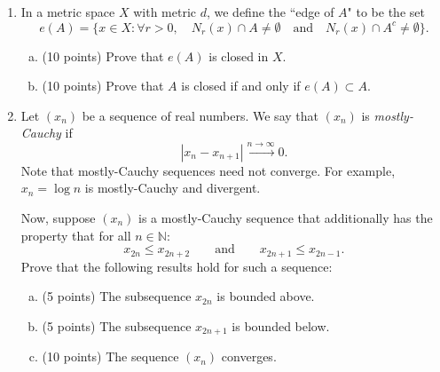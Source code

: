 \documentclass{amsart}
\newtheorem{theorem}{Theorem}
\begin{document}
\begin{enumerate}[1.]
\begin{theorem}
\begin{proof}
		Assume that $A$ is countable. 
		Consider any $b \in B$. Then $f^{-1}(b) \subseteq A$ is at most countable and non-empty. Therefore, we can enumerate $f^{-1}(b)$
		as follows:
		\[
			f^{-1}(b) = \{a_{1,b}, a_{2,b}, a_{3,b}, ... \}	
		\]
		Let us construct a function $g: B \to A$ defined as follows:
		\[
			g(b) = a_{1,b}	
		\]
		We must first show that $g$ is injective.
		Consider the case where $g(b_1) = g(b_2)$ for some $b_1, b_2 \in B$. Then we know that 
		\[
			a_{1,b_1} = a_{1,b_2}
		\]
		Since $f$ is a function, $f^{-1}(b_1) \cap f^{-1}(b_2) = \phi$ (one element of the domain cannot be sent to multiple values in the range).
		Thus, the only way for $a_{1,b_1} = a_{1,b_2}$ is if $b_1 = b_2$. Thus, $g$ is injective.
		Finally, we see from Lemma 19 that, since $g: B \to A$ is injective and $A$ is countable,
		then $B$ is countable.
	\end{proof}
\end{theorem}
\newpage
\item In a metric space $X$ with metric $d$, we define the ``edge of $A$" to be the set
\[ e(A)=\{ x\in X : \forall r >0, \quad N_r(x)\cap A\neq \emptyset \quad \text{and} \quad N_r(x)\cap A^c \neq \emptyset   \}.\]
\begin{enumerate}[(a)]
	\item (10 points) Prove that $e(A)$ is closed in $X$.
	\item (10 points) Prove that $A$ is closed if and only if $e(A)\subset A$.
\end{enumerate}

\newpage
\item Let $(x_n)$ be a sequence of real numbers. We say that $(x_n)$ is \emph{mostly-Cauchy} if
\[ |x_n - x_{n+1}| \xrightarrow{n \to \infty} 0.\]
Note that mostly-Cauchy sequences need not converge. For example, $x_n=\log n$ is mostly-Cauchy and divergent.

Now, suppose $(x_n)$ is a mostly-Cauchy sequence that additionally has the property that for all $n \in \mathbb{N}$:
\[ x_{2n} \leq x_{2n+2} \qquad \text{and} \qquad x_{2n+1} \leq x_{2n-1}.\]
Prove that the following results hold for such a sequence:
\begin{enumerate}[(a)]
	\item (5 points) The subsequence $x_{2n}$ is bounded above.
	\item (5 points) The subsequence $x_{2n+1}$ is bounded below.
	\item (10 points) The sequence $(x_n)$ converges.
\end{enumerate}
\end{enumerate}
\end{document}
